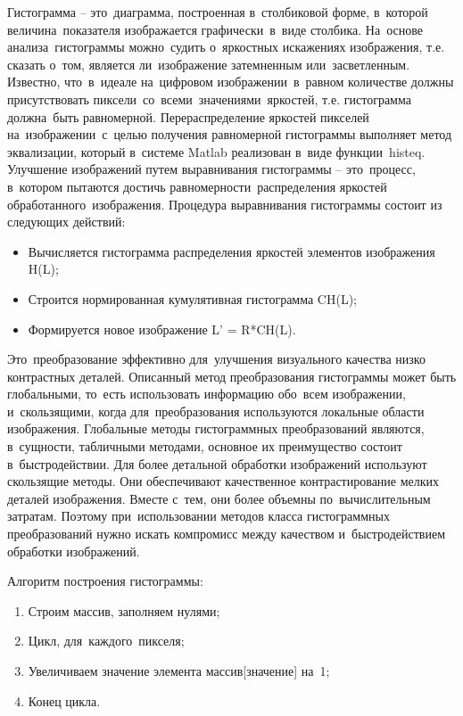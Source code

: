 \documentclass{ou}
\begin{document}
Гистограмма -- это~диаграмма, построенная в~столбиковой форме, в~которой величина~показателя изображается графически~в~виде столбика. На~основе анализа~гистограммы можно~судить о~яркостных искажениях изображения, т.е. сказать о~том, является ли~изображение затемненным или~засветленным. Известно, что~в~идеале на~цифровом изображении~в~равном количестве должны присутствовать пиксели~со~всеми~значениями~яркостей, т.е. гистограмма должна~быть равномерной. Перераспределение яркостей пикселей на~изображении~с~целью получения равномерной гистограммы выполняет метод эквализации, который в~системе Matlab реализован в~виде функции~histeq. Улучшение изображений путем выравнивания гистограммы -- это~процесс, в~котором пытаются достичь равномерности~распределения яркостей обработанного~изображения. Процедура выравнивания гистограммы состоит из следующих действий:
\begin{itemize}[label=-, leftmargin=0em, itemindent=3.35em, nosep]
\item Вычисляется гистограмма распределения яркостей элементов изображения H(L);
\item Строится нормированная кумулятивная гистограмма CH(L);
\item Формируется новое изображение L' = R*CH(L).
\end{itemize}
Это~преобразование эффективно для~улучшения визуального качества низко контрастных деталей. Описанный метод преобразования гистограммы может быть глобальными, то~есть использовать информацию обо~всем изображении, и~скользящими, когда для~преобразования используются локальные области изображения. Глобальные методы гистограммных преобразований являются, в~сущности, табличными методами, основное их преимущество состоит в~быстродействии. Для более детальной обработки изображений используют скользящие методы. Они обеспечивают качественное контрастирование мелких деталей изображения. Вместе с~тем, они более объемны по~вычислительным затратам. Поэтому при~использовании методов класса гистограммных преобразований нужно искать компромисс между качеством и~быстродействием обработки изображений.

Алгоритм построения гистограммы:
\begin{enumerate}[leftmargin=0em, itemindent=3.75em, nosep, label=\arabic*)]
\item Строим массив, заполняем нулями;
\item Цикл, для~каждого~пикселя;
\item Увеличиваем значение элемента массив[значение] на~1;
\item Конец цикла.
\end{enumerate}
\end{document}
